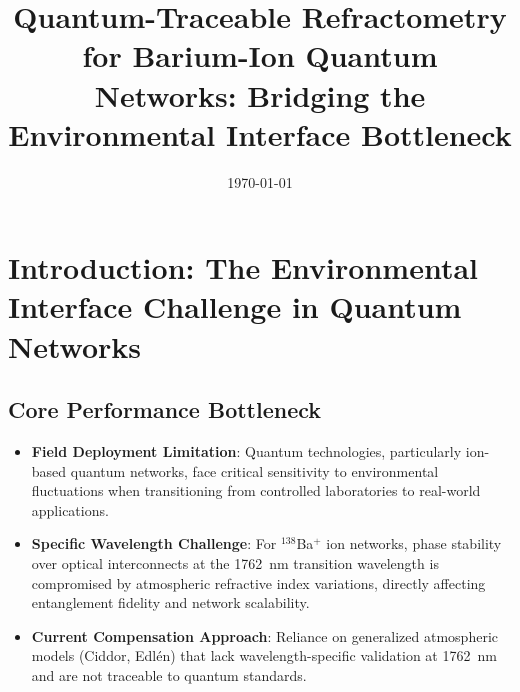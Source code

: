 \documentclass[aip,reprint,groupedaddress,onecolumn,superscriptaddress]{revtex4-2}
\begin{document}
\title{Quantum-Traceable Refractometry for Barium-Ion Quantum Networks: Bridging the Environmental Interface Bottleneck}
\date{\today}

\maketitle

\section{Introduction: The Environmental Interface Challenge in Quantum Networks}

\subsection{Core Performance Bottleneck}
\begin{itemize}
    \item \textbf{Field Deployment Limitation}: Quantum technologies, particularly ion-based quantum networks, face critical sensitivity to environmental fluctuations when transitioning from controlled laboratories to real-world applications.
    
    \item \textbf{Specific Wavelength Challenge}: For $^{138}$Ba$^+$ ion networks, phase stability over optical interconnects at the \SI{1762}{\nano\meter} transition wavelength is compromised by atmospheric refractive index variations, directly affecting entanglement fidelity and network scalability.
    
    \item \textbf{Current Compensation Approach}: Reliance on generalized atmospheric models (Ciddor, Edlén) that lack wavelength-specific validation at \SI{1762}{\nano\meter} and are not traceable to quantum standards.
\end{itemize}
\end{document}
